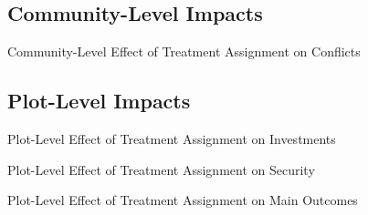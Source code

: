 \documentclass[10pt]{article}
\begin{document}
\clearpage

\subsection{Community-Level Impacts}

\begin{table}[H]
\caption{Community-Level Effect of Treatment Assignment on Conflicts}
\begin{center}
\begin{adjustbox}{max width = \textwidth}

\end{adjustbox}
\end{center}
\end{table}


\clearpage
\subsection{Plot-Level Impacts}


\begin{table}[H]
\caption{Plot-Level Effect of Treatment Assignment on Investments}
\begin{center}
\begin{adjustbox}{max width = \textwidth}

\end{adjustbox}
\end{center}
\end{table}


\begin{table}[H]
\caption{Plot-Level Effect of Treatment Assignment on Security}
\begin{center}
\begin{adjustbox}{max width = \textwidth}

\end{adjustbox}
\end{center}
\end{table}

\begin{table}[H]
\caption{Plot-Level Effect of Treatment Assignment on Main Outcomes}
\begin{center}
\begin{adjustbox}{max width = \textwidth}

\end{adjustbox}
\end{center}
\end{table}
\end{document}

